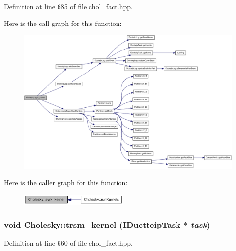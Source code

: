 Definition at line 685 of file chol\_\-fact.hpp.

Here is the call graph for this function:\nopagebreak
\begin{figure}[H]
\begin{center}
\leavevmode
\includegraphics[width=420pt]{class_cholesky_aa448c6006ef1b072de230dc5427372e9_cgraph}
\end{center}
\end{figure}


Here is the caller graph for this function:\nopagebreak
\begin{figure}[H]
\begin{center}
\leavevmode
\includegraphics[width=152pt]{class_cholesky_aa448c6006ef1b072de230dc5427372e9_icgraph}
\end{center}
\end{figure}
\hypertarget{class_cholesky_ab0b681bba7b9c3f706d18a6d15fe905f}{
\subsubsection[{trsm\_\-kernel}]{\setlength{\rightskip}{0pt plus 5cm}void Cholesky::trsm\_\-kernel ({\bf IDuctteipTask} $\ast$ {\em task})}}
\label{class_cholesky_ab0b681bba7b9c3f706d18a6d15fe905f}


Definition at line 660 of file chol\_\-fact.hpp.

